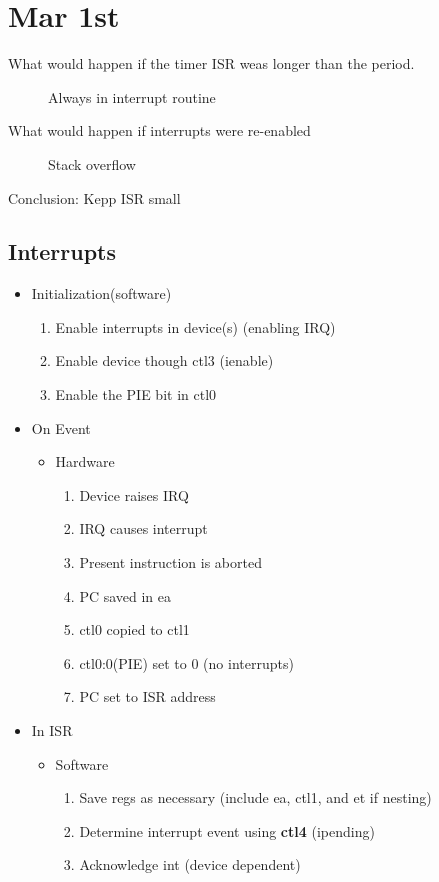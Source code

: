 \documentclass[11pt]{article}
\begin{document}
\section{Mar 1st}
\label{sec:orgheadline80}
\begin{description}
\item[{What would happen if the timer ISR weas longer than the period.}] Always in interrupt routine
\item[{What would happen if interrupts were re-enabled}] Stack overflow
\end{description}
Conclusion: Kepp ISR small
\subsection{Interrupts}
\label{sec:orgheadline78}
\begin{itemize}
\item Initialization(software)
\begin{enumerate}
\item Enable interrupts in device(s) (enabling IRQ)
\item Enable device though ctl3 (ienable)
\item Enable the PIE bit in ctl0
\end{enumerate}
\item On Event
\begin{itemize}
\item Hardware
\begin{enumerate}
\item Device raises IRQ
\item IRQ causes interrupt
\item Present instruction is aborted
\item PC saved in ea
\item ctl0 copied to ctl1
\item ctl0:0(PIE) set to 0 (no interrupts)
\item PC set to ISR address
\end{enumerate}
\end{itemize}
\item In ISR
\begin{itemize}
\item Software
\begin{enumerate}
\item Save regs as necessary (include ea, ctl1, and et if nesting)
\item Determine interrupt event using \textbf{ctl4} (ipending)
\item Acknowledge int (device dependent)

\end{enumerate}
\end{itemize}
\end{itemize}
\end{document}
